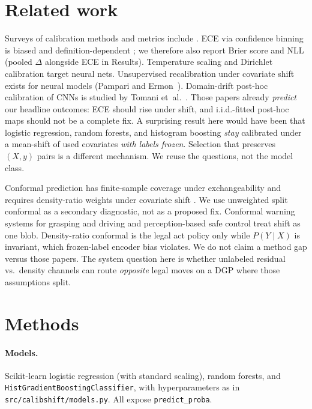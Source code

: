 \documentclass[10pt,twocolumn]{article}
\begin{document}
\section{Related work}
Surveys of calibration methods and metrics include
\cite{silvafilho2021survey,wang2023survey}.
ECE via confidence binning \cite{naeini2015bbq,guo2017calibration} is
biased and definition-dependent
\cite{nixon2019measuring,kumar2019verified,vaicenavicius2019evaluating};
we therefore also report Brier score \cite{brier1950verification} and
NLL \cite{gneiting2007scoring} (pooled $\Delta$ alongside ECE in
Results). Temperature scaling
\cite{guo2017calibration} and Dirichlet calibration
\cite{kull2019dirichlet} target neural nets. Unsupervised recalibration
under covariate shift exists for neural models
(Pampari and Ermon~\cite{pampari2020unsupervised}). Domain-drift post-hoc
calibration of CNNs is studied by Tomani et~al.~\cite{tomani2021posthoc}.
Those papers already
\textit{predict} our headline outcomes: ECE should rise under shift, and
i.i.d.-fitted post-hoc maps should not be a complete fix. A surprising
result here would have been that logistic regression, random forests, and
histogram boosting \emph{stay} calibrated under a mean-shift of used
covariates \emph{with labels frozen}. Selection that preserves
$(X,y)$ pairs is a different mechanism. We reuse the questions, not the
model class.

Conformal prediction has finite-sample coverage under exchangeability
\cite{vovk2005algorithmic,lei2016distributionfree,angelopoulos2021gentle}
and requires density-ratio weights under covariate shift
\cite{tibshirani2019covariate}. We use unweighted split conformal as a
secondary diagnostic, not as a proposed fix.
Conformal warning systems for grasping and driving
\cite{luo2021conformal} and perception-based safe control
\cite{yang2023safeperception,huang2023conformalpolicy} treat shift as
one blob. Density-ratio conformal \cite{tibshirani2019covariate} is the
legal act policy only while $P(Y\mid X)$ is invariant, which frozen-label
encoder bias violates. We do not claim a method gap versus those papers.
The system question here is whether unlabeled residual vs.\ density
channels can route \emph{opposite} legal moves on a DGP where those
assumptions split.

\section{Methods}
\paragraph{Models.}
Scikit-learn logistic regression (with standard scaling), random forests,
and \texttt{HistGradientBoostingClassifier}, with hyperparameters as in
\texttt{src/calibshift/models.py}. All expose \texttt{predict\_proba}.
\end{document}
